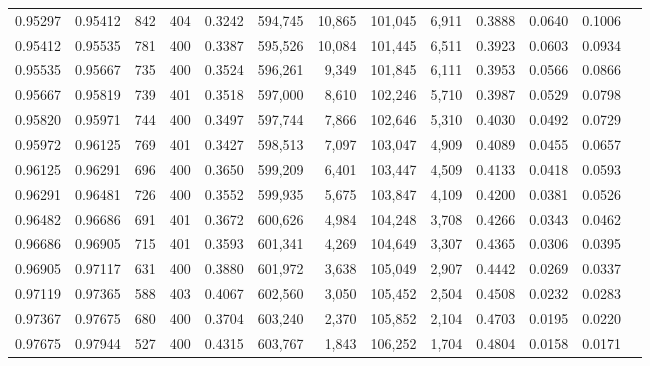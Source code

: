 \begin{tabular}{rrrrrrrrrrrrr}
0.95297 & 0.95412 &   842 & 404 &                                     0.3242 & 594,745 &  10,865 & 101,045 &   6,911 & 0.3888 & 0.0640 & 0.1006 \\
0.95412 & 0.95535 &   781 & 400 &                                     0.3387 & 595,526 &  10,084 & 101,445 &   6,511 & 0.3923 & 0.0603 & 0.0934 \\
0.95535 & 0.95667 &   735 & 400 &                                     0.3524 & 596,261 &   9,349 & 101,845 &   6,111 & 0.3953 & 0.0566 & 0.0866 \\
0.95667 & 0.95819 &   739 & 401 &                                     0.3518 & 597,000 &   8,610 & 102,246 &   5,710 & 0.3987 & 0.0529 & 0.0798 \\
0.95820 & 0.95971 &   744 & 400 &                                     0.3497 & 597,744 &   7,866 & 102,646 &   5,310 & 0.4030 & 0.0492 & 0.0729 \\
0.95972 & 0.96125 &   769 & 401 &                                     0.3427 & 598,513 &   7,097 & 103,047 &   4,909 & 0.4089 & 0.0455 & 0.0657 \\
0.96125 & 0.96291 &   696 & 400 &                                     0.3650 & 599,209 &   6,401 & 103,447 &   4,509 & 0.4133 & 0.0418 & 0.0593 \\
0.96291 & 0.96481 &   726 & 400 &                                     0.3552 & 599,935 &   5,675 & 103,847 &   4,109 & 0.4200 & 0.0381 & 0.0526 \\
0.96482 & 0.96686 &   691 & 401 &                                     0.3672 & 600,626 &   4,984 & 104,248 &   3,708 & 0.4266 & 0.0343 & 0.0462 \\
0.96686 & 0.96905 &   715 & 401 &                                     0.3593 & 601,341 &   4,269 & 104,649 &   3,307 & 0.4365 & 0.0306 & 0.0395 \\
0.96905 & 0.97117 &   631 & 400 &                                     0.3880 & 601,972 &   3,638 & 105,049 &   2,907 & 0.4442 & 0.0269 & 0.0337 \\
0.97119 & 0.97365 &   588 & 403 &                                     0.4067 & 602,560 &   3,050 & 105,452 &   2,504 & 0.4508 & 0.0232 & 0.0283 \\
0.97367 & 0.97675 &   680 & 400 &                                     0.3704 & 603,240 &   2,370 & 105,852 &   2,104 & 0.4703 & 0.0195 & 0.0220 \\
0.97675 & 0.97944 &   527 & 400 &                                     0.4315 & 603,767 &   1,843 & 106,252 &   1,704 & 0.4804 & 0.0158 & 0.0171 \\

\end{tabular}
